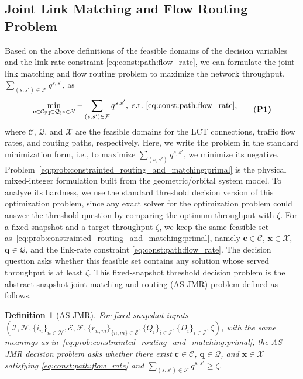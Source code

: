 \documentclass[journal]{IEEEtran}
\newtheorem{defi}{Definition}
\begin{document}
\subsection{Joint Link Matching and Flow Routing Problem}
Based on the above definitions of the feasible domains of the decision variables and the link-rate constraint \eqref{eq:const:path:flow_rate}, we can formulate the joint link matching and flow routing problem to maximize the network throughput, $\sum_{(s,s')\in\mathcal{F}} q^{s,s'}$, as
\begin{equation}\label{eq:prob:constrainted_routing_and_matching:primal}
  \begin{aligned}
  \min_{
    \substack{
      \mathbf{c}\in\mathcal{C};\mathbf{q}\in\mathcal{Q};\mathbf{x}\in\mathcal{X}
    }
  }
  -\sum_{(s,s')\in\mathcal{F}} q^{s,s'}, \ \text{s.t.}\ \eqref{eq:const:path:flow_rate},
  \end{aligned}
\tag{\bf{P1}}
\end{equation}
where $\mathcal{C}$, $\mathcal{Q}$, and $\mathcal{X}$ are the feasible domains for the LCT connections, traffic flow rates, and routing paths, respectively.
Here, we write the problem in the standard minimization form, i.e., to maximize $\sum_{(s,s')} q^{s,s'}$, we minimize its negative.
Problem~\eqref{eq:prob:constrainted_routing_and_matching:primal} is the physical mixed-integer formulation built from the geometric/orbital system model. To analyze its hardness, we use the standard threshold decision version of this optimization problem, since any exact solver for the optimization problem could answer the threshold question by comparing the optimum throughput with $\zeta$. For a fixed snapshot and a target throughput $\zeta$, we keep the same feasible set as~\eqref{eq:prob:constrainted_routing_and_matching:primal}, namely $\mathbf{c}\in\mathcal{C}$, $\mathbf{x}\in\mathcal{X}$, $\mathbf{q}\in\mathcal{Q}$, and the link-rate constraint \eqref{eq:const:path:flow_rate}. The decision question asks whether this feasible set contains any solution whose served throughput is at least $\zeta$. This fixed-snapshot threshold decision problem is the abstract snapshot joint matching and routing (AS-JMR) problem defined as follows.


\begin{defi}[AS-JMR]
For fixed snapshot inputs $(\mathcal{I},\mathcal{N},\{i_n\}_{n\in\mathcal{N}},\mathcal{E},\mathcal{F},\{r_{n,m}\}_{\{n,m\}\in\mathcal{E}},\{Q_i\}_{i\in\mathcal{I}},\{D_i\}_{i\in\mathcal{I}},\zeta)$, with the same meanings as in~\eqref{eq:prob:constrainted_routing_and_matching:primal}, the AS-JMR decision problem asks whether there exist $\mathbf{c}\in\mathcal{C}$, $\mathbf{q}\in\mathcal{Q}$, and $\mathbf{x}\in\mathcal{X}$ satisfying \eqref{eq:const:path:flow_rate} and $\sum_{(s,s')\in\mathcal{F}}q^{s,s'}\geq\zeta$.
\end{defi}
\end{document}
